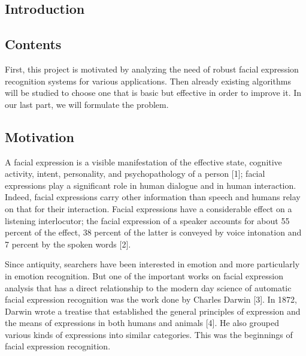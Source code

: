 \newpage
  \begin{titlepage}
    \vspace*{\fill}
      \part{Introduction}
    \vspace*{\fill}
  \end{titlepage}

\chapter*{Contents}
First, this project is motivated by analyzing the need of robust facial expression recognition systems for various applications. Then already existing algorithms will be studied to choose one that is basic but effective in order to improve it. In our last part, we will formulate the problem.


\chapter{Motivation}

A facial expression is a visible manifestation of the effective state, cognitive activity, intent, personality, and psychopathology of a person [1]; facial expressions play a significant role in human dialogue and in human interaction. Indeed, facial expressions carry other information than speech and humans relay on that for their interaction. Facial expressions have a considerable effect on a listening interlocutor; the facial expression of a speaker accounts for about 55 percent of the effect, 38 percent of the latter is conveyed by voice intonation and 7 percent by the spoken words [2].

Since antiquity, searchers have been interested in emotion and more particularly in emotion recognition. But one of the important works on facial expression analysis that has a direct relationship to the modern day science of automatic facial expression recognition was the work done by Charles Darwin [3]. In 1872, Darwin wrote a treatise that established the general principles of expression and the means of expressions in both humans and animals [4]. He also grouped various kinds of expressions into similar categories. This was the beginnings of facial expression recognition.

